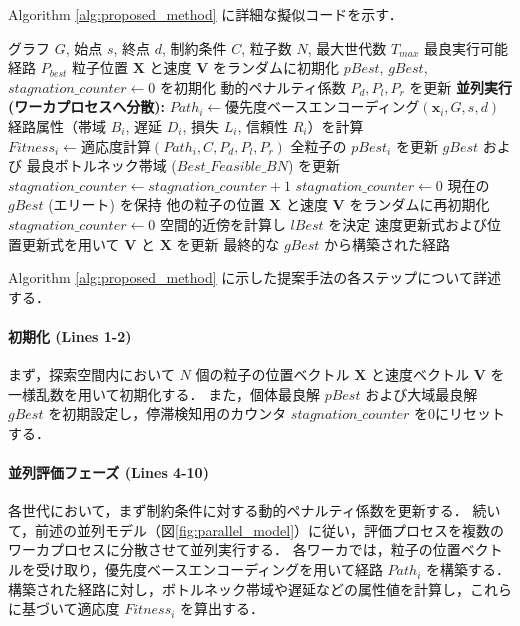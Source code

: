 Algorithm \ref{alg:proposed_method} に詳細な擬似コードを示す．

\begin{algorithm}[H]
\caption{リスタート戦略を用いた並列PSO (Proposed Method)}
\label{alg:proposed_method}
\begin{algorithmic}[1]
\Require グラフ $G$, 始点 $s$, 終点 $d$, 制約条件 $C$, 粒子数 $N$, 最大世代数 $T_{max}$
\Ensure 最良実行可能経路 $P_{best}$
\State 粒子位置 $\boldsymbol{X}$ と速度 $\boldsymbol{V}$ をランダムに初期化
\State $pBest$, $gBest$, $stagnation\_counter \leftarrow 0$ を初期化
    \State 動的ペナルティ係数 $P_d, P_l, P_r$ を更新
    \State \textbf{並列実行 (ワーカプロセスへ分散):}
        \State $Path_i \leftarrow \text{優先度ベースエンコーディング}(\boldsymbol{x}_i, G, s, d)$
        \State 経路属性（帯域 $B_i$, 遅延 $D_i$, 損失 $L_i$, 信頼性 $R_i$）を計算
        \State $Fitness_i \leftarrow \text{適応度計算}(Path_i, C, P_d, P_l, P_r)$
    \EndFor
    \State 全粒子の $pBest_i$ を更新
    \State $gBest$ および 最良ボトルネック帯域 ($Best\_Feasible\_BN$) を更新
        \State $stagnation\_counter \leftarrow stagnation\_counter + 1$
    \Else
        \State $stagnation\_counter \leftarrow 0$
    \EndIf
     
        \State 現在の $gBest$ (エリート) を保持
        \State 他の粒子の位置 $\boldsymbol{X}$ と速度 $\boldsymbol{V}$ をランダムに再初期化
        \State $stagnation\_counter \leftarrow 0$
    \EndIf
    \State 空間的近傍を計算し $lBest$ を決定
    \State 速度更新式および位置更新式を用いて $\boldsymbol{V}$ と $\boldsymbol{X}$ を更新
\EndFor
\State \Return 最終的な $gBest$ から構築された経路
\end{algorithmic}
\end{algorithm}

Algorithm \ref{alg:proposed_method} に示した提案手法の各ステップについて詳述する．

\paragraph{初期化 (Lines 1-2)}
まず，探索空間内において $N$ 個の粒子の位置ベクトル $\boldsymbol{X}$ と速度ベクトル $\boldsymbol{V}$ を一様乱数を用いて初期化する．
また，個体最良解 $pBest$ および大域最良解 $gBest$ を初期設定し，停滞検知用のカウンタ $stagnation\_counter$ を0にリセットする．

\paragraph{並列評価フェーズ (Lines 4-10)}
各世代において，まず制約条件に対する動的ペナルティ係数を更新する．
続いて，前述の並列モデル（図\ref{fig:parallel_model}）に従い，評価プロセスを複数のワーカプロセスに分散させて並列実行する．
各ワーカでは，粒子の位置ベクトルを受け取り，優先度ベースエンコーディングを用いて経路 $Path_i$ を構築する．
構築された経路に対し，ボトルネック帯域や遅延などの属性値を計算し，これらに基づいて適応度 $Fitness_i$ を算出する．

